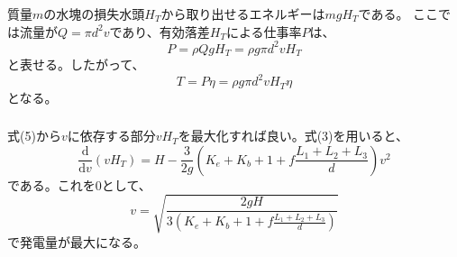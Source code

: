 \documentclass[a4paper]{jsarticle}
\begin{document}
\subsubsection{}
質量$m$の水塊の損失水頭$H_T$から取り出せるエネルギーは$mgH_T$である。
ここでは流量が$Q = \pi d^2 v$であり、有効落差$H_T$による仕事率$P$は、
\begin{equation}
  P = \rho Q g H_T = \rho g \pi d^2 v H_T
\end{equation}
と表せる。したがって、
\begin{equation}
  T = P \eta = \rho g \pi d^2 v H_T \eta
\end{equation}
となる。

\subsubsection{}
式(5)から$v$に依存する部分$v H_T$を最大化すれば良い。式(3)を用いると、
\begin{equation}
  \frac{\mathrm{d}}{\mathrm{d} v}(v H_T)
  = H - \frac{3}{2g} \left(K_e + K_b + 1 + f \frac{L_1 + L_2 + L_3}{d}\right) v^2
\end{equation}
である。これを0として、
\begin{equation}
  v = \sqrt{\frac{2 g H}{3 (K_e + K_b + 1 + f \frac{L_1 + L_2 + L_3}{d})}}
\end{equation}
で発電量が最大になる。

\subsection{}
\end{document}
